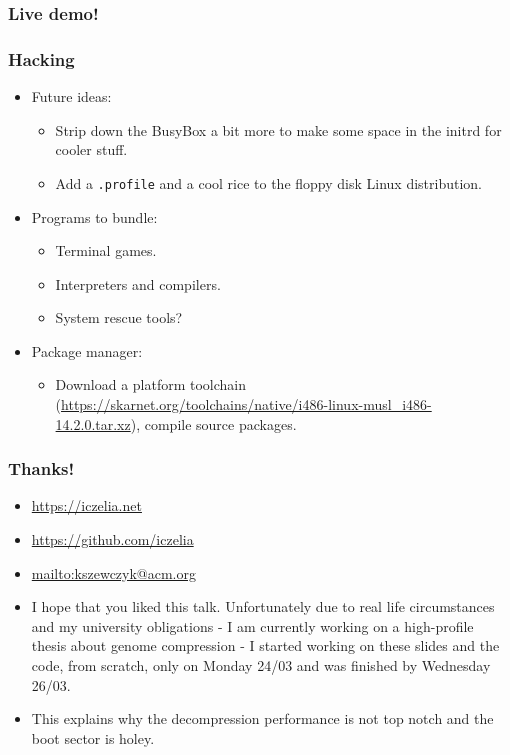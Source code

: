 \documentclass{beamer}
\begin{document}
\begin{frame}
\frametitle{Live demo!}
\end{frame}

\begin{frame}[t,fragile]
\frametitle{Hacking}
\begin{itemize}
  \item Future ideas:
  \begin{itemize}
    \item Strip down the BusyBox a bit more to make some space in the initrd for cooler stuff.
    \item Add a \verb|.profile| and a cool rice to the floppy disk Linux distribution.
  \end{itemize}
  \item Programs to bundle:
  \begin{itemize}
    \item Terminal games.
    \item Interpreters and compilers.
    \item System rescue tools?
  \end{itemize}
  \item Package manager:
  \begin{itemize}
    \item Download a platform toolchain (\url{https://skarnet.org/toolchains/native/i486-linux-musl_i486-14.2.0.tar.xz}), compile source packages.
  \end{itemize}
\end{itemize}
\end{frame}

\begin{frame}
\frametitle{Thanks!}
  \begin{itemize}
    \item \url{https://iczelia.net}
    \item \url{https://github.com/iczelia}
    \item \url{mailto:kszewczyk@acm.org}
    \item I hope that you liked this talk. Unfortunately due to real life circumstances and my university obligations - I am currently working on a high-profile thesis about genome compression - I started working on these slides and the code, from scratch, only on Monday 24/03 and was finished by Wednesday 26/03.
    \item This explains why the decompression performance is not top notch and the boot sector is holey.
  \end{itemize}
\end{frame}
\end{document}

